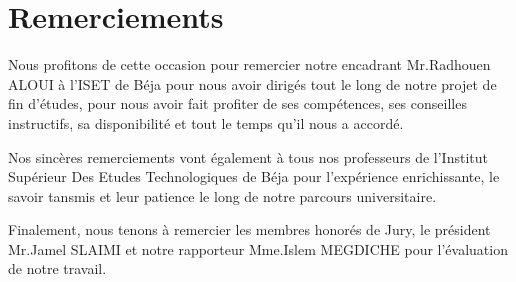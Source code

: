 \chapter*{Remerciements}



Nous profitons de cette occasion pour remercier notre encadrant Mr.Radhouen ALOUI à l'ISET de Béja pour nous avoir dirigés tout le long de notre projet de fin d'études, pour nous avoir fait profiter de ses compétences, ses conseilles instructifs, sa disponibilité et tout le temps qu'il nous a accordé.

Nos sincères remerciements vont également à tous nos professeurs de l'Institut Supérieur Des Etudes Technologiques de Béja pour l'expérience enrichissante, le savoir tansmis et leur patience le long de notre parcours universitaire.

Finalement, nous tenons à remercier les membres honorés de Jury, le président Mr.Jamel SLAIMI et notre rapporteur Mme.Islem MEGDICHE pour l'évaluation de notre travail.
